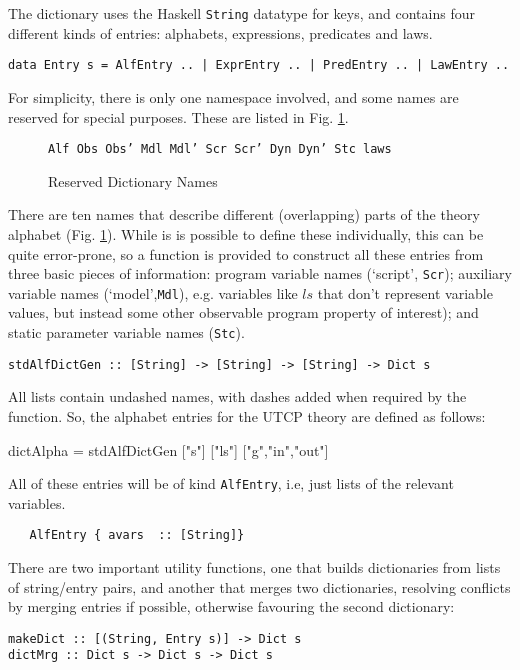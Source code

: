 The dictionary uses the Haskell \texttt{String} datatype for keys,
and contains four different kinds of entries: alphabets,
expressions, predicates and laws.
{\small
\begin{verbatim}
data Entry s = AlfEntry .. | ExprEntry .. | PredEntry .. | LawEntry ..
\end{verbatim}
}
For simplicity, there is only one namespace involved,
and some names are reserved for special purposes.
These are listed in Fig. \ref{fig:rsvd-names}.
\begin{figure}[t]
  \centering
\texttt{Alf Obs Obs' Mdl Mdl' Scr Scr' Dyn Dyn' Stc laws}
  \caption{Reserved Dictionary Names}\label{fig:rsvd-names}
\end{figure}
There are ten names that describe different
(overlapping)
parts of the theory alphabet (Fig. \ref{fig:rsvd-names}).
While is is possible to define these individually,
this can be quite error-prone,
so a function is provided to construct all these entries
from three basic pieces of information:
program variable names (`script', \texttt{Scr});
auxiliary variable names (`model',\texttt{Mdl}),
e.g. variables like $ls$ that don't represent variable values,
but instead some other observable program property of interest);
and static parameter variable names (\texttt{Stc}).
\begin{verbatim}
stdAlfDictGen :: [String] -> [String] -> [String] -> Dict s
\end{verbatim}
All lists contain undashed names, with dashes added when required
by the function.
So, the alphabet entries for the UTCP theory are defined as follows:
\begin{code}
dictAlpha = stdAlfDictGen ["s"] ["ls"] ["g","in","out"]
\end{code}
All of these entries will be of kind \texttt{AlfEntry},
i.e, just lists of the relevant variables.
\begin{verbatim}
   AlfEntry { avars  :: [String]}
\end{verbatim}
There are two important utility functions,
one that builds dictionaries from lists of string/entry pairs,
and another that merges two dictionaries, resolving conflicts
by merging entries if possible, otherwise favouring the
second dictionary:
\begin{verbatim}
makeDict :: [(String, Entry s)] -> Dict s
dictMrg :: Dict s -> Dict s -> Dict s
\end{verbatim}

